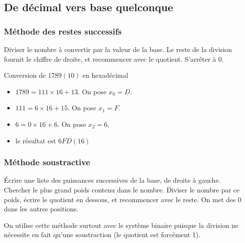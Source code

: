 \subsection{De d\'ecimal vers base quelconque}


\subsubsection{M\'ethode des restes successifs}

Diviser le nombre \`a convertir par  la valeur de la base. Le reste de
la division fournit le chiffre de droite, et recommencer avec le quotient.
S'arr\^eter \`a 0.

\begin{exemple}{Conversion de $1789 (10)$ en hexad\'ecimal}
\begin{itemize}
\item $1789 = 111 \times 16 + 13$. On pose $x_0 = D$.
\item $111 = 6 \times 16 + 15$. On pose $x_1 = F$.
\item $6 = 0 \times 16 + 6$. On pose $x_2 = 6$.
\item le r\'esultat est $6FD (16)$ 
\end{itemize}
\end{exemple}

\subsubsection{M\'ethode soustractive}


Écrire une liste des puissances successives de la base, 
de droite \`a gauche. Chercher le 
plus grand poids contenu dans le nombre. Diviser le nombre par ce poids, 
\'ecrire le quotient en dessous, et recommencer avec le reste. On met des 
0 dans les autres positions.

On utilise cette m\'ethode surtout avec le syst\`eme binaire puisque la
division ne n\'ecessite en fait qu'une soustraction (le quotient
est forc\'ement 1). 

